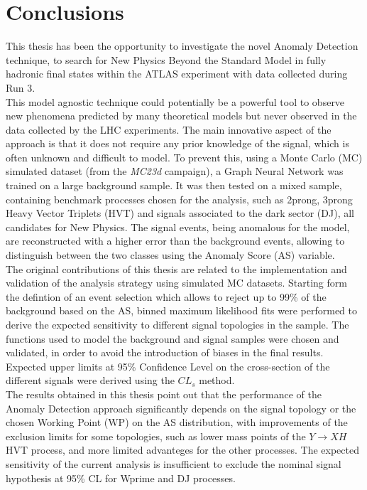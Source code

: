 \chapter{Conclusions} \label{chap:concl}

This thesis has been the opportunity to investigate the novel Anomaly Detection technique, to search for New Physics Beyond the Standard Model in fully hadronic final states within the ATLAS experiment with data collected during Run 3.\\
This model agnostic technique could potentially be a powerful tool to observe new phenomena predicted by many theoretical models but never observed in the data collected by the LHC experiments.
The main innovative aspect of the approach is that it does not require any prior knowledge of the signal, which is often unknown and difficult to model.
To prevent this, using a Monte Carlo (MC) simulated dataset (from the \textit{MC23d} campaign), a Graph Neural Network was trained on a large background sample.
It was then tested on a mixed sample, containing benchmark processes chosen for the analysis, such as 2prong, 3prong Heavy Vector Triplets (HVT) and signals associated to the dark sector (DJ), all candidates for New Physics.
The signal events, being anomalous for the model, are reconstructed with a higher error than the background events, allowing to distinguish between the two classes using the Anomaly Score (AS) variable.\\
The original contributions of this thesis are related to the implementation and validation of the analysis strategy using simulated MC datasets.
Starting form the defintion of an event selection which allows to reject up to 99\% of the background based on the AS, binned maximum likelihood fits were performed to derive the expected sensitivity to different signal topologies in the sample.
The functions used to model the background and signal samples were chosen and validated, in order to avoid the introduction of biases in the final results.
Expected upper limits at 95\% Confidence Level on the cross-section of the different signals were derived using the $CL_s$ method.\\
The results obtained in this thesis point out that the performance of the Anomaly Detection approach significantly depends on the signal topology or the chosen Working Point (WP) on the AS distribution, with improvements of the exclusion limits for some topologies, such as lower mass points of the $Y\to XH$ HVT process, and more limited advanteges for the other processes. 
The expected sensitivity of the current analysis is insufficient to exclude the nominal signal hypothesis at 95\% CL for Wprime and DJ processes.
